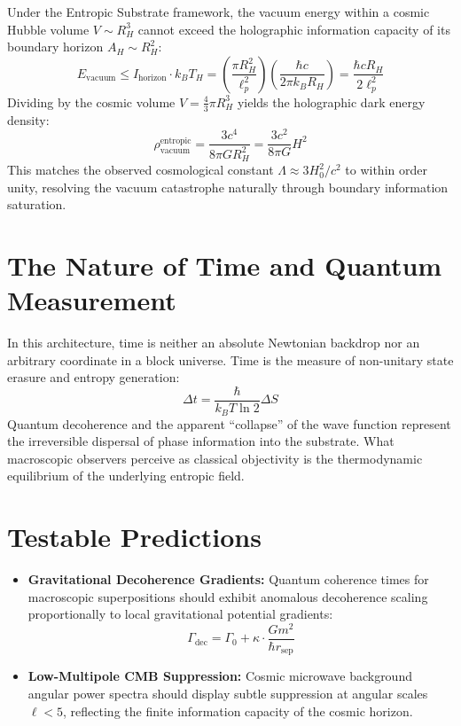 \documentclass[11pt,a4paper]{article}
\begin{document}
Under the Entropic Substrate framework, the vacuum energy within a cosmic Hubble volume $V \sim R_H^3$ cannot exceed the holographic information capacity of its boundary horizon $A_H \sim R_H^2$:
\begin{equation}
E_{\text{vacuum}} \le I_{\text{horizon}} \cdot k_B T_H = \left(\frac{\pi R_H^2}{\ell_p^2}\right) \left(\frac{\hbar c}{2\pi k_B R_H}\right) = \frac{\hbar c R_H}{2 \ell_p^2}
\end{equation}
Dividing by the cosmic volume $V = \frac{4}{3}\pi R_H^3$ yields the holographic dark energy density:
\begin{equation}
\rho_{\text{vacuum}}^{\text{entropic}} = \frac{3 c^4}{8\pi G R_H^2} = \frac{3 c^2}{8\pi G} H^2
\end{equation}
This matches the observed cosmological constant $\Lambda \approx 3 H_0^2 / c^2$ to within order unity, resolving the vacuum catastrophe naturally through boundary information saturation.

\section{The Nature of Time and Quantum Measurement}
In this architecture, time is neither an absolute Newtonian backdrop nor an arbitrary coordinate in a block universe. Time is the measure of non-unitary state erasure and entropy generation:
\begin{equation}
\Delta t = \frac{\hbar}{k_B T \ln 2} \Delta S
\end{equation}
Quantum decoherence and the apparent ``collapse'' of the wave function represent the irreversible dispersal of phase information into the substrate. What macroscopic observers perceive as classical objectivity is the thermodynamic equilibrium of the underlying entropic field.

\section{Testable Predictions}
\begin{itemize}
    \item \textbf{Gravitational Decoherence Gradients:} Quantum coherence times for macroscopic superpositions should exhibit anomalous decoherence scaling proportionally to local gravitational potential gradients:
    \begin{equation}
    \Gamma_{\text{dec}} = \Gamma_0 + \kappa \cdot \frac{G m^2}{\hbar r_{\text{sep}}}
    \end{equation}
    \item \textbf{Low-Multipole CMB Suppression:} Cosmic microwave background angular power spectra should display subtle suppression at angular scales $\ell < 5$, reflecting the finite information capacity of the cosmic horizon.
\end{itemize}
\end{document}
